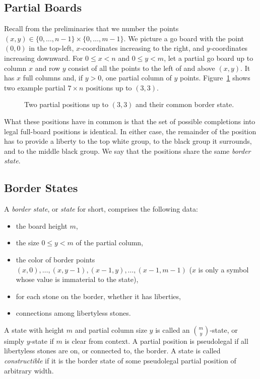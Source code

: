 \documentclass{article}
\begin{document}
\subsection{Partial Boards}

Recall from the preliminaries that we number the points
$(x,y) \in \{0,\ldots,n-1\}\times \{0,\ldots,m-1\}$.
We picture a go board with the point $(0,0)$ in the top-left,
$x$-coordinates increasing to the right, and $y$-coordinates
increasing downward.
For $0 \leq x < n$ and $0 \leq y < m$,
let a partial go board up to column $x$ and row $y$ consist
of all the points to the left of and above $(x,y)$.
It has $x$ full columns and, if $y > 0$, one partial column of $y$ points.
Figure~\ref{border} shows two example partial $7\times n$ positions
up to $(3,3)$.

\begin{figure}
\epsfxsize=10cm 
\caption{Two partial positions up to $(3,3)$ and their common border state.}
\label{border}
\end{figure}

What these positions have in common is that
the set of possible completions into legal full-board positions
is identical. In either case, the remainder of the position has
to provide a liberty to the top white group, to the
black group it surrounds, and to the middle black group.
We say that the positions share the same {\em border state}.

\subsection{Border States}

\begin{defin}
A {\em border state}, or {\em state} for short, comprises the following
data:
\begin{itemize}
\item the board height $m$,
\item the size $0 \leq y <m $ of the partial column,
\item the color of border points
      $(x,0),\ldots,(x,y-1),(x-1,y),\ldots,(x-1,m-1)$
      ($x$ is only a symbol whose value is immaterial to the state),
\item for each stone on the border, whether it has liberties,
\item connections among libertyless stones.
\end{itemize}


A state with height $m$ and partial column size $y$ is called an
$\binom{m}{y}$-state,
or simply $y$-state if $m$ is clear from context.
A partial position is pseudolegal if
all libertyless stones are on, or connected to, the border.
A state is called {\em constructible} if it is the border state of some
pseudolegal partial position of arbitrary width.
\end{defin}
\end{document}
